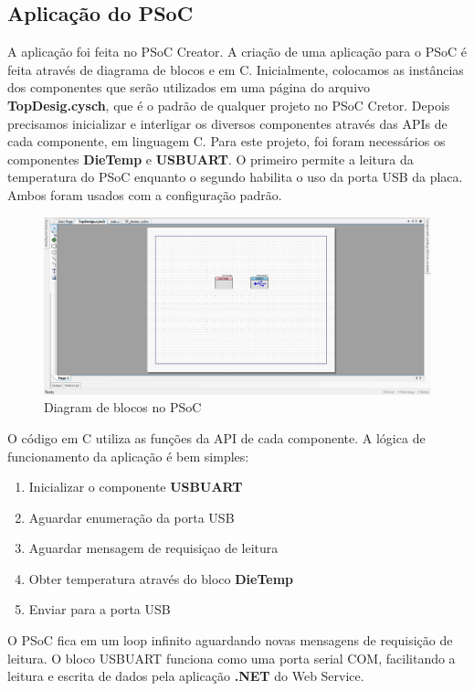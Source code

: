 \documentclass[a4paper,12pt,titlepage]{article}
\begin{document}
	\subsection{Aplicação do PSoC}
		A aplicação foi feita no PSoC Creator. A criação de uma aplicação para o PSoC é feita através de diagrama de blocos e em C. Inicialmente, colocamos as instâncias dos componentes que serão utilizados em uma página do arquivo \textbf{TopDesig.cysch}, que é o padrão de qualquer projeto no PSoC Cretor. Depois precisamos inicializar e interligar os diversos componentes através das APIs de cada componente, em linguagem C. Para este projeto, foi foram necessários os componentes \textbf{DieTemp} e \textbf{USBUART}. O primeiro permite a leitura da temperatura do PSoC enquanto o segundo habilita o uso da porta USB da placa. Ambos foram usados com a configuração padrão.
			\begin{figure}[h!]
				\centering
				\includegraphics[width=1\linewidth]{psoc1}
				\caption{Diagram de blocos no PSoC}
				\label{fig:psoc1}
			\end{figure}
		
		O código em C utiliza as funções da API de cada componente. A lógica de funcionamento da aplicação é bem simples:
			\begin{enumerate}
				\item Inicializar o componente \textbf{USBUART}
				\item Aguardar enumeração da porta USB
				\item Aguardar mensagem de requisiçao de leitura
				\item Obter temperatura através do bloco \textbf{DieTemp}
				\item Enviar para a porta USB				  
			\end{enumerate}
		O PSoC fica em um loop infinito aguardando novas mensagens de requisição de leitura. O bloco USBUART funciona como uma porta serial COM, facilitando a leitura e escrita de dados pela aplicação \textbf{.NET} do Web Service. 
		
\end{document}
